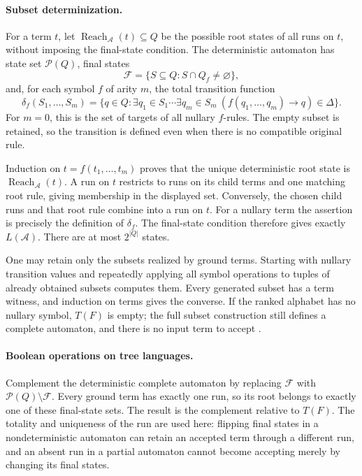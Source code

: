 \paragraph{Subset determinization.}
\label{sec:p09-finite-tree-determinization}
For a term \(t\), let \(\operatorname{Reach}_{\mathcal A}(t)\subseteq Q\)
be the possible root states of all runs on \(t\), without imposing
the final-state condition.
The deterministic automaton has state set \(\mathcal P(Q)\), final
states
\[
 \mathcal F=\{S\subseteq Q:S\cap Q_f\ne\varnothing\},
\]
and, for each symbol \(f\) of arity \(m\), the total transition function
\[
 \delta_f(S_1,\ldots,S_m)
 =\{q\in Q:\exists q_1\in S_1\cdots\exists q_m\in S_m\
                    (f(q_1,\ldots,q_m)\to q)\in\Delta\}.
\]
For \(m=0\), this is the set of targets of all nullary \(f\)-rules.
The empty subset is retained, so the transition is defined even
when there is no compatible original rule.

Induction on \(t=f(t_1,\ldots,t_m)\) proves that the unique
deterministic root state is \(\operatorname{Reach}_{\mathcal A}(t)\).
A run on \(t\) restricts to runs on its child terms and one matching
root rule, giving membership in the displayed set.
Conversely, the chosen child runs and that root rule combine into
a run on \(t\).  For a nullary term the assertion is precisely
the definition of \(\delta_f\).
The final-state condition therefore gives exactly \(L(\mathcal A)\).
There are at most \(2^{|Q|}\) states.

One may retain only the subsets realized by ground terms.
Starting with nullary transition values and repeatedly applying all
symbol operations to tuples of already obtained subsets computes
them.  Every generated subset has a term witness, and induction on
terms gives the converse.  If the ranked alphabet has no nullary
symbol, \(T(F)\) is empty; the full subset construction still defines
a complete automaton, and there is no input term to accept
\cite[Theorem~1.1.9]{ComonEtAl2007}.

\paragraph{Boolean operations on tree languages.}
\label{sec:p09-finite-tree-boolean}
Complement the deterministic complete automaton by replacing
\(\mathcal F\) with \(\mathcal P(Q)\setminus\mathcal F\).
Every ground term has exactly one run, so its root belongs to exactly
one of these final-state sets.  The result is the complement relative
to \(T(F)\).
The totality and uniqueness of the run are used here: flipping final
states in a nondeterministic automaton can retain an accepted term
through a different run, and an absent run in a partial automaton
cannot become accepting merely by changing its final states.

